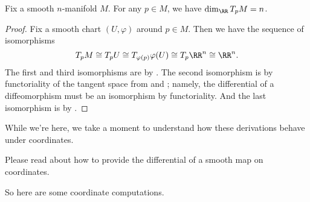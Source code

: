 \documentclass[../notes.tex]{subfiles}
\begin{document}
\begin{corollary} \label{cor:tangent-on-manifold}
	Fix a smooth $n$-manifold $M$. For any $p\in M$, we have $\dim_\RR T_pM=n$.
\end{corollary}
\begin{proof}
	Fix a smooth chart $(U,\varphi)$ around $p\in M$. Then we have the sequence of isomorphisms
	\[T_pM\cong T_pU\cong T_{\varphi(p)}\varphi(U)\cong T_p\RR^n\cong\RR^n.\]
	The first and third isomorphisms are by . The second isomorphism is by functoriality of the tangent space from  and ; namely, the differential of a diffeomorphism must be an isomorphism by functoriality. And the last isomorphism is by .
\end{proof}
While we're here, we take a moment to understand how these derivations behave under coordinates.
\begin{remark}
	Please read about how to provide the differential of a smooth map on coordinates.
\end{remark}
So here are some coordinate computations.
\end{document}
